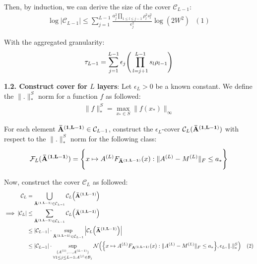 \noindent Then, by induction, we can derive the size of the cover $\mathcal{C}_{L-1}$:
\begin{align*}
    \log|\mathcal{C}_{L-1}| \le \sum_{j=1}^{L-1}\frac{a_j^2\prod_{1\le l \le j-1}\rho_l^2s_l^2}{\epsilon_j^2}\log(2W^2) \ \ \ (1)
\end{align*}

\noindent With the aggregated granularity:
\begin{align*}
    \tau_{L-1} = \sum_{j=1}^{L-1}\epsilon_j \Bigg( \prod_{l=j+1}^{L-1} s_l\rho_{l-1} \Bigg)
\end{align*}


\noindent\newline\textbf{1.2. Construct cover for $L$ layers}: Let $\epsilon_L>0$ be a known constant. We define the $\|.\|_*^S$ norm for a function $f$ as followed:
\begin{align*}
    \|f\|_*^S = \max_{x_* \in S}\|f(x_*)\|_\infty
\end{align*} 


\noindent For each element ${\bf {\bar A}^{(1, L-1)}}\in\mathcal{C}_{L-1}$, construct the $\epsilon_L$-cover $\mathcal{C}_L({\bf {\bar A}^{(1, L-1)}})$ with respect to the $\|.\|_*^S$ norm for the following class:
\begin{align*}
    \mathcal{F}_L({\bf {\bar A}^{(1, L-1)}}) = \Bigg\{ 
        x \mapsto A^{(L)}F_{\bf {\bar A}^{(1, L-1)}}(x) : \|A^{(L)}-M^{(L)}\|_F \le a_*
     \Bigg\}
\end{align*} 

\noindent Now, construct the cover $\mathcal{C}_L$ as followed:
\begin{align*}
    \mathcal{C}_L &= \bigcup_{{\bf {\bar A}^{(1, L-1)}}\in\mathcal{C}_{L-1}} \mathcal{C}_L\Big( 
        {\bf {\bar A}^{(1, L-1)}}
     \Big) \\
    \implies 
    |\mathcal{C}_L| &\le \sum_{{\bf {\bar A}^{(1, L-1)}}\in\mathcal{C}_{L-1}} \mathcal{C}_L\Big( 
        {\bf {\bar A}^{(1, L-1)}}
     \Big) \\
    &\le |\mathcal{C}_{L-1}| \cdot \sup_{{\bf {\bar A}^{(1, L-1)}}\in\mathcal{C}_{L-1}}\Big| 
        \mathcal{C}_L\Big( 
            {\bf {\bar A}^{(1, L-1)}}
         \Big)
     \Big| \\
    &\le |\mathcal{C}_{L-1}| \cdot \sup_{
        \substack{
            (A^{(1)}, \dots, A^{(L-1)}) \\
            \forall 1\le j\le L-1 : A^{(j)}\in\mathcal{B}_j
        }
    }\mathcal{N}\Big( 
        \Big\{ 
            x \mapsto A^{(L)}F_{\bf A^{(1, L-1)}}(x) : \|A^{(L)} - M^{(L)}\|_F \le a_*
         \Big\}, \epsilon_L, \|.\|_*^S
     \Big) \ \ \ (2)
\end{align*}

